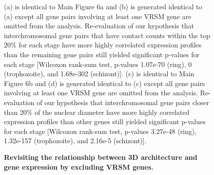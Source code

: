 \documentclass{article}
\begin{document}
\begin{figure}
  \begin{center}
  \hspace{0.05\textwidth}
  \hspace{0.05\textwidth}
  \hspace{0.05\textwidth}
   \end{center}
\caption{{\bf Revisiting the relationship between 3D architecture and gene expression by excluding VRSM genes. }}
{   (a) is identical to Main Figure 6a and (b) is generated identical to (a) except all gene pairs
    involving at least one VRSM gene are omitted from the analysis. Re-evaluation of our
    hypothesis that interchromosomal gene pairs that have contact counts within the top 20\%
    for each stage have more highly correlated expression profiles than the remaining gene pairs
    still yielded significant p-values for each stage [Wilcoxon rank-sum test, p-values 1.07e-70 (ring),
    0 (trophozoite), and 1.68e-302 (schizont)].
    (c) is identical to Main Figure 6b and (d) is generated identical to (c) except all gene pairs
    involving at least one VRSM gene are omitted from the analysis. Re-evaluation of our
    hypothesis that interchromosomal gene pairs closer than 20\% of the nuclear diameter have more
    highly correlated expression profiles than other genes still yielded
    significant p-values for each stage [Wilcoxon rank-sum test, p-values 3.27e-48 (ring),
    1.32e-157 (trophozoite), and 2.16e-5 (schizont)].
}
\label{suppfig:expVSdistWithoutVRSM}
\end{figure}
\clearpage
\end{document}
